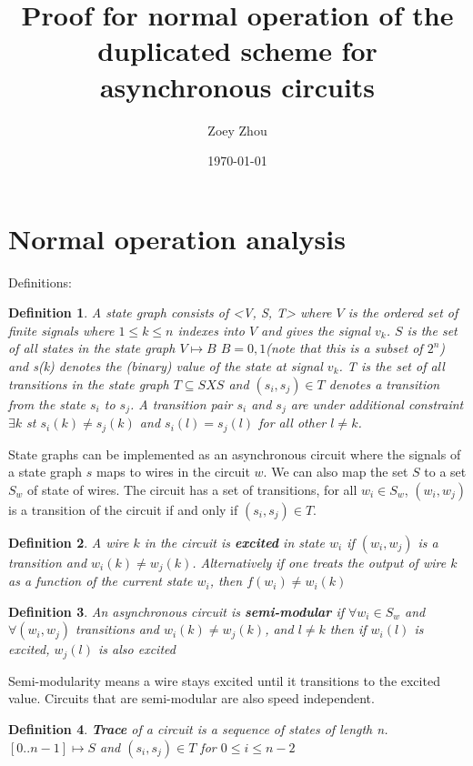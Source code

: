 \documentclass{article}
\title{Proof for normal operation of the duplicated scheme for asynchronous circuits}
\author{Zoey Zhou}
\date{\today}
\newtheorem*{definition}{Definition}
\begin{document}
\section{Normal operation analysis}
Definitions:  
\begin{definition}A state graph consists of <V, S, T> where $V$ is the ordered set of finite signals where $1\leq k \leq n$ indexes into $V$ and gives the signal $v_k$.  $S$ is the set of all states in the state graph $V \mapsto B$  $B={0,1}$(note that this is a subset of $2^n$) %
and s(k) denotes the (binary) value of the state at signal $v_k$.  T is the set of all transitions in the state graph $T \subseteq S X S$ and $(s_i, s_j) \in T$ denotes a transition from the state $s_i$ to $s_j$.  A transition pair $s_i$ and $s_j$ are under additional constraint 
$\exists k$ st $s_i(k)\neq s_j(k)$ and $s_i(l)=s_j(l)$ for all other $l \neq k$. \end{definition}

State graphs can be implemented as an asynchronous circuit where the signals of a state graph $s$ maps to wires in the circuit $w$. %
We can also map the set $S$ to a set $S_w$ of state of wires. The circuit has a set of transitions, for all $w_i \in S_w$, $(w_i, w_j)$ is a transition of the circuit if and only if $(s_i, s_j) \in T$.
\begin{definition}A wire $k$ in the circuit is \textbf{excited} in state $w_i$ if $(w_i,w_j)$ is a transition and $w_i(k) \neq w_j(k)$.  Alternatively if one treats the output of wire $k$ as a function of the current state $w_i$, then $f(w_i)\neq w_i(k)$\end{definition} 

\begin{definition}An asynchronous circuit is \textbf{semi-modular} if $\forall w_i \in S_w$ and $\forall (w_i,w_j)$ transitions and $w_i(k) \neq w_j(k)$, and $l\neq k$ then if $w_i(l)$ is excited, $w_j(l)$ is also excited \end{definition}
Semi-modularity means a wire stays excited until it transitions to the excited value.  Circuits that are semi-modular are also speed independent. \newline

\begin{definition} \textbf{Trace} of a circuit is a sequence of states of length n.  $[0 .. n-1] \mapsto S$ and $(s_i,s_j) \in T$ for $0 \leq i \leq n-2$\end{definition} 
\end{document}
